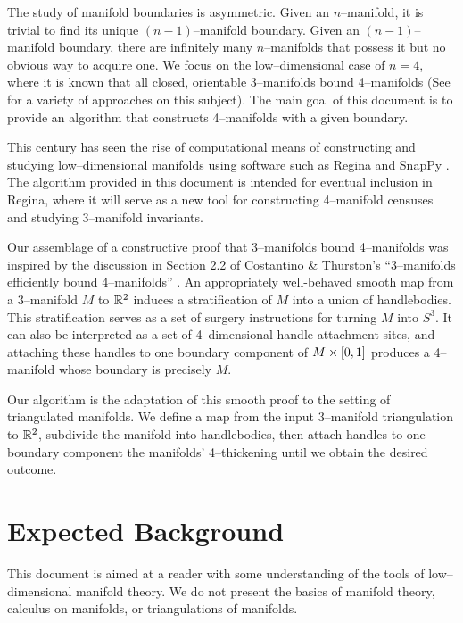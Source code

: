 \label{chapter:introduction}

The study of manifold boundaries is asymmetric.
Given an $n$--manifold, it is trivial to find its unique $(n-1)$--manifold boundary.
Given an $(n-1)$--manifold boundary, there are infinitely many $n$--manifolds that possess it but no obvious way to acquire one.
We focus on the low--dimensional case of $n=4$, where it is known that all closed, orientable 3--manifolds bound 4--manifolds (See \cite{wbr61, Rourke85, Thom} for a variety of approaches on this subject).
The main goal of this document is to provide an algorithm that constructs 4--manifolds with a given boundary.

This century has seen the rise of computational means of constructing and studying low--dimensional manifolds using software such as Regina \cite{regina} and SnapPy \cite{culler2017snappy}.
The algorithm provided in this document is intended for eventual inclusion in Regina, where it will serve as a new tool for constructing 4--manifold censuses and studying 3--manifold invariants.

Our assemblage of a constructive proof that 3--manifolds bound 4--manifolds was inspired by the discussion in Section 2.2 of Costantino \& Thurston's ``3--manifolds efficiently bound 4--manifolds'' \cite{CostThur08}.
An appropriately well-behaved smooth map from a 3--manifold $M$ to $\mathbb{R}^2$ induces a stratification of $M$ into a union of handlebodies.
This stratification serves as a set of surgery instructions for turning $M$ into $S^3$.
It can also be interpreted as a set of 4--dimensional handle attachment sites, and attaching these handles to one boundary component of $M\times[0,1]$ produces a 4--manifold whose boundary is precisely $M$.

Our algorithm is the adaptation of this smooth proof to the setting of triangulated manifolds.
We define a map from the input 3--manifold triangulation to $\mathbb{R}^2$, subdivide the manifold into handlebodies, then attach handles to one boundary component the manifolds' 4--thickening until we obtain the desired outcome.

\section{Expected Background}

This document is aimed at a reader with some understanding of the tools of low--dimensional manifold theory.
We do not present the basics of manifold theory, calculus on manifolds, or triangulations of manifolds.

